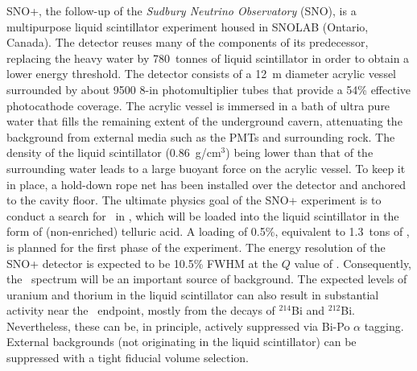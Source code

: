 SNO+, the follow-up of the \emph{Sudbury Neutrino Observatory} (SNO), is a multipurpose liquid scintillator experiment housed in SNOLAB (Ontario, Canada). The detector reuses many of the components of its predecessor, replacing the heavy water by 780~tonnes of liquid scintillator in order to obtain a lower energy threshold. The detector consists of a 12~m diameter acrylic vessel surrounded by about 9500 8-in photomultiplier tubes that provide a 54\% effective photocathode coverage. The acrylic vessel is immersed in a bath of ultra pure water that fills the remaining extent of the underground cavern, attenuating the background from external media such as the PMTs and surrounding rock. The density of the liquid scintillator (0.86~g/cm$^{3}$) being lower than that of the surrounding water leads to a large buoyant force on the acrylic vessel. To keep it in place, a hold-down rope net has been installed over the detector and anchored to the cavity floor. The ultimate physics goal of the SNO+ experiment is to conduct a search for \bbonu\ in , which will be loaded into the liquid scintillator in the form of (non-enriched) telluric acid. A loading of 0.5\%, equivalent to 1.3~tons of \TE, is planned for the first phase of the experiment. The energy resolution of the SNO+ detector is expected to be 10.5\% FWHM at the $Q$ value of \TE. Consequently, the \bbtnu\ spectrum will be an important source of background. The expected levels of uranium and thorium in the liquid scintillator can also result in substantial activity near the \bbonu\ endpoint, mostly from the decays of $^{214}$Bi and $^{212}$Bi. Nevertheless, these can be, in principle, actively suppressed via Bi-Po $\alpha$ tagging. External backgrounds (not originating in the liquid scintillator) can be suppressed with a tight fiducial volume selection.
